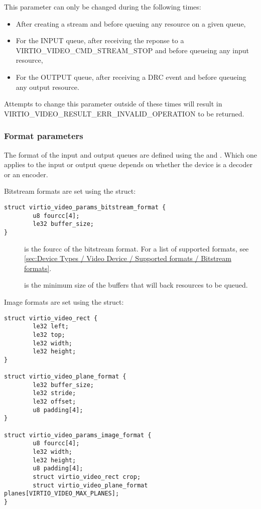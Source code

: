 This parameter can only be changed during the following times:

\begin{itemize}
\item
  After creating a stream and before queuing any resource on a given
  queue,
\item
  For the INPUT queue, after receiving the reponse to a
  VIRTIO\_VIDEO\_CMD\_STREAM\_STOP and before queueing any input
  resource,
\item
  For the OUTPUT queue, after receiving a DRC event and before queueing
  any output resource.
\end{itemize}

Attempts to change this parameter outside of these times will result in
VIRTIO\_VIDEO\_RESULT\_ERR\_INVALID\_OPERATION to be returned.

\subsubsection{Format parameters}\label{sec:Device Types / Video Device / Parameters / Format parameters}

The format of the input and output queues are defined using the
 and
. Which one applies to the input
or output queue depends on whether the device is a decoder or an
encoder.

Bitstream formats are set using the
 struct:

\begin{lstlisting}
struct virtio_video_params_bitstream_format {
        u8 fourcc[4];
        le32 buffer_size;
}
\end{lstlisting}

\begin{description}
\item[]
is the fourcc of the bitstream format. For a list of supported formats,
see
\ref{sec:Device Types / Video Device / Supported formats / Bitstream formats}.
\item[]
is the minimum size of the buffers that will back resources to be
queued.
\end{description}

Image formats are set using the 
struct:

\begin{lstlisting}
struct virtio_video_rect {
        le32 left;
        le32 top;
        le32 width;
        le32 height;
}

struct virtio_video_plane_format {
        le32 buffer_size;
        le32 stride;
        le32 offset;
        u8 padding[4];
}

struct virtio_video_params_image_format {
        u8 fourcc[4];
        le32 width;
        le32 height;
        u8 padding[4];
        struct virtio_video_rect crop;
        struct virtio_video_plane_format planes[VIRTIO_VIDEO_MAX_PLANES];
}
\end{lstlisting}

